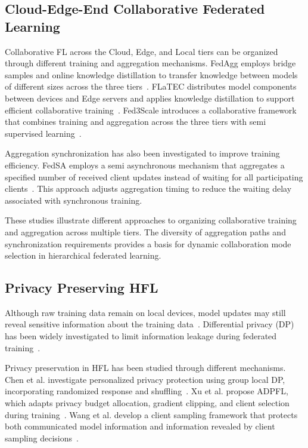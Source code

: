 \documentclass[5p,times]{elsarticle}
\theoremstyle{plain}
\theoremstyle{definition}
\theoremstyle{remark}
\begin{document}
	\subsection{Cloud-Edge-End Collaborative Federated Learning}
	
	Collaborative FL across the Cloud, Edge, and Local
	tiers can be organized through different training
	and aggregation mechanisms. FedAgg employs bridge
	samples and online knowledge distillation to
	transfer knowledge between models of different
	sizes across the three tiers~\cite{BSBODP}.
	FLaTEC distributes model components between
	devices and Edge servers and applies knowledge
	distillation to support efficient collaborative
	training~\cite{FLaTEC2026}.
	Fed3Scale introduces a collaborative framework
	that combines training and aggregation across
	the three tiers with semi supervised
	learning~\cite{fed3scale}.
	
	Aggregation synchronization has also been
	investigated to improve training efficiency.
	FedSA employs a semi asynchronous mechanism
	that aggregates a specified number of received
	client updates instead of waiting for all
	participating clients~\cite{Ma2021}.
	This approach adjusts aggregation timing to
	reduce the waiting delay associated with
	synchronous training.
	
	
	These studies illustrate different approaches to organizing collaborative training and aggregation across multiple tiers.	The diversity of aggregation paths and synchronization requirements provides a basis for dynamic collaboration mode selection in hierarchical federated learning.
	
	
	
	\subsection{Privacy Preserving HFL}
	
	Although raw training data remain on local devices,
	model updates may still reveal sensitive information
	about the training data~\cite{zhu2019dlg}.
	Differential privacy (DP) has been widely investigated
	to limit information leakage during federated
	training~\cite{dwork2006calibrating}.
	
	Privacy preservation in HFL has been studied
	through different mechanisms.
	Chen et al. investigate personalized privacy
	protection using group local DP, incorporating
	randomized response and shuffling~\cite{GLDP}.
	Xu et al. propose ADPFL, which adapts privacy
	budget allocation, gradient clipping, and
	client selection during training~\cite{xu2025adpfl}.
	Wang et al. develop a client sampling framework
	that protects both communicated model information
	and information revealed by client sampling
	decisions~\cite{11267456}.
	
\end{document}
